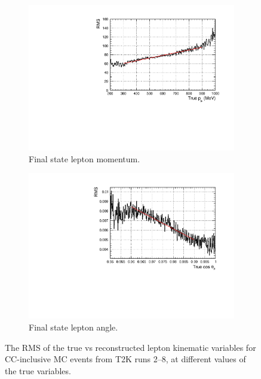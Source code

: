 \begin{figure}
\centering
\begin{subfigure}{.5\textwidth}
  \centering
  \includegraphics[width=0.95\linewidth]{figs/momres1d}
  \caption{Final state lepton momentum.}
  \label{fig:momres1d}
\end{subfigure}%
\begin{subfigure}{.5\textwidth}
  \centering
  \includegraphics[width=0.95\linewidth]{figs/angres1d}
  \caption{Final state lepton angle.}
  \label{fig:angres1d}
\end{subfigure}
\caption{The RMS of the true vs reconstructed lepton kinematic variables for CC-inclusive MC events from T2K runs 2--8, at different values of the true variables.}
\label{fig:res1d}
\end{figure}

